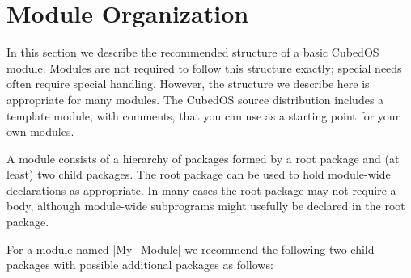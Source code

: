 
\section{Module Organization}
\label{sec:manual-module-organization}

In this section we describe the recommended structure of a basic CubedOS module. Modules are not
required to follow this structure exactly; special needs often require special handling.
However, the structure we describe here is appropriate for many modules. The CubedOS source
distribution includes a template module, with comments, that you can use as a starting point for
your own modules.

A module consists of a hierarchy of packages formed by a root package and (at least) two child
packages. The root package can be used to hold module-wide declarations as appropriate. In many
cases the root package may not require a body, although module-wide subprograms might usefully
be declared in the root package.

For a module named |My_Module| we recommend the following two child packages with possible
additional packages as follows:

